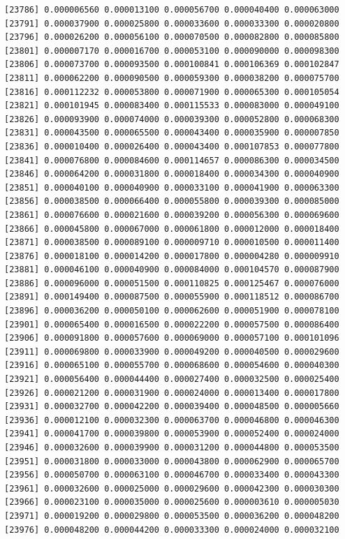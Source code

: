 \documentclass[]{article}
\begin{document}
\begin{verbatim}
[23786] 0.000006560 0.000013100 0.000056700 0.000040400 0.000063000
[23791] 0.000037900 0.000025800 0.000033600 0.000033300 0.000020800
[23796] 0.000026200 0.000056100 0.000070500 0.000082800 0.000085800
[23801] 0.000007170 0.000016700 0.000053100 0.000090000 0.000098300
[23806] 0.000073700 0.000093500 0.000100841 0.000106369 0.000102847
[23811] 0.000062200 0.000090500 0.000059300 0.000038200 0.000075700
[23816] 0.000112232 0.000053800 0.000071900 0.000065300 0.000105054
[23821] 0.000101945 0.000083400 0.000115533 0.000083000 0.000049100
[23826] 0.000093900 0.000074000 0.000039300 0.000052800 0.000068300
[23831] 0.000043500 0.000065500 0.000043400 0.000035900 0.000007850
[23836] 0.000010400 0.000026400 0.000043400 0.000107853 0.000077800
[23841] 0.000076800 0.000084600 0.000114657 0.000086300 0.000034500
[23846] 0.000064200 0.000031800 0.000018400 0.000034300 0.000040900
[23851] 0.000040100 0.000040900 0.000033100 0.000041900 0.000063300
[23856] 0.000038500 0.000066400 0.000055800 0.000039300 0.000085000
[23861] 0.000076600 0.000021600 0.000039200 0.000056300 0.000069600
[23866] 0.000045800 0.000067000 0.000061800 0.000012000 0.000018400
[23871] 0.000038500 0.000089100 0.000009710 0.000010500 0.000011400
[23876] 0.000018100 0.000014200 0.000017800 0.000004280 0.000009910
[23881] 0.000046100 0.000040900 0.000084000 0.000104570 0.000087900
[23886] 0.000096000 0.000051500 0.000110825 0.000125467 0.000076000
[23891] 0.000149400 0.000087500 0.000055900 0.000118512 0.000086700
[23896] 0.000036200 0.000050100 0.000062600 0.000051900 0.000078100
[23901] 0.000065400 0.000016500 0.000022200 0.000057500 0.000086400
[23906] 0.000091800 0.000057600 0.000069000 0.000057100 0.000101096
[23911] 0.000069800 0.000033900 0.000049200 0.000040500 0.000029600
[23916] 0.000065100 0.000055700 0.000068600 0.000054600 0.000040300
[23921] 0.000056400 0.000044400 0.000027400 0.000032500 0.000025400
[23926] 0.000021200 0.000031900 0.000024000 0.000013400 0.000017800
[23931] 0.000032700 0.000042200 0.000039400 0.000048500 0.000005660
[23936] 0.000012100 0.000032300 0.000063700 0.000046800 0.000046300
[23941] 0.000041700 0.000039800 0.000053900 0.000052400 0.000024000
[23946] 0.000032600 0.000039900 0.000031200 0.000044800 0.000053500
[23951] 0.000031800 0.000033000 0.000043800 0.000062900 0.000065700
[23956] 0.000050700 0.000063100 0.000046700 0.000033400 0.000043300
[23961] 0.000032600 0.000025000 0.000029600 0.000042300 0.000030300
[23966] 0.000023100 0.000035000 0.000025600 0.000003610 0.000005030
[23971] 0.000019200 0.000029800 0.000053500 0.000036200 0.000048200
[23976] 0.000048200 0.000044200 0.000033300 0.000024000 0.000032100

\end{verbatim}
\end{document}
